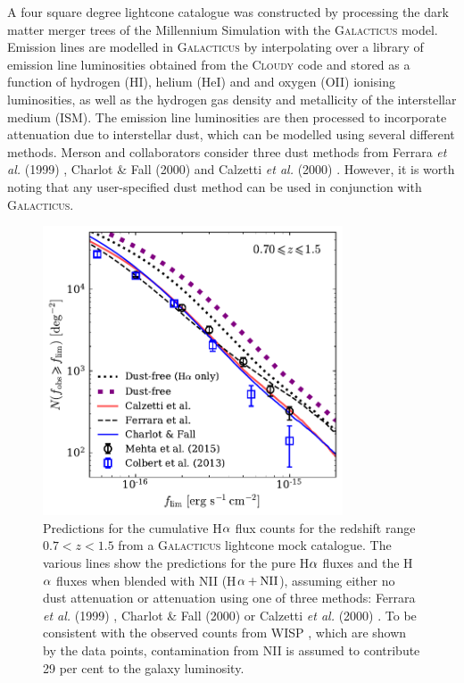 A four square degree lightcone catalogue was constructed by processing
the dark matter merger trees of the Millennium Simulation
\cite{Springel05} with the \textsc{Galacticus} model. Emission lines
are modelled in \textsc{Galacticus} by interpolating over a library of
emission line luminosities obtained from the \textsc{Cloudy}
\cite{Ferland13} code and stored as a function of hydrogen (HI),
helium (HeI) and and oxygen (OII) ionising luminosities, as well as
the hydrogen gas density and metallicity of the interstellar medium
(ISM). The emission line luminosities are then processed to
incorporate attenuation due to interstellar dust, which can be
modelled using several different methods. Merson and collaborators
consider three dust methods from Ferrara \textit{et al.} (1999)
\cite{Ferrara99}, Charlot \& Fall (2000) \cite{Charlot00} and Calzetti
\textit{et al.} (2000) \cite{Calzetti00}. However, it is worth noting that any
user-specified dust method can be used in conjunction with
\textsc{Galacticus}.

\begin{figure}
  \centering
  \includegraphics[width=3.5in]{Plots/merson17LightconeHalphaCumulativeCounts.pdf}
  \caption{Predictions for the cumulative H${\rm \alpha}$ flux counts
    for the redshift range $0.7<z<1.5$ from a \textsc{Galacticus}
    lightcone mock catalogue. The various lines show the predictions
    for the pure H${\rm \alpha}$ fluxes and the H${\rm \alpha}$ fluxes
    when blended with NII (H${\rm \alpha}+{\rm NII}$), assuming either
    no dust attenuation or attenuation using one of three methods:
    Ferrara \textit{et al.} (1999) \protect\cite{Ferrara99}, Charlot
    \& Fall (2000) \protect\cite{Charlot00} or Calzetti \textit{et
      al.} (2000) \protect\cite{Calzetti00}. To be consistent with
    the observed counts from WISP \protect\cite{Colbert13,Mehta2015},
    which are shown by the data points, contamination from NII is
    assumed to contribute 29 per cent to the galaxy luminosity.}
  \label{fig:halpha_flux_counts}
\end{figure}


